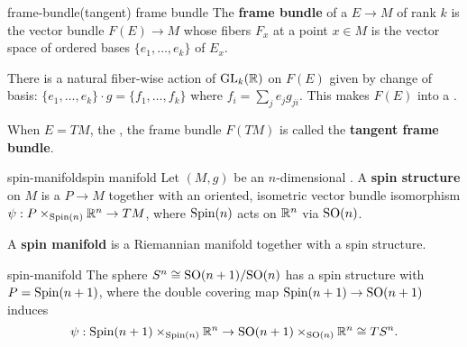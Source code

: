 \begin{topic}{frame-bundle}{(tangent) frame bundle}
    The \textbf{frame bundle} of a  $E \to M$ of rank $k$ is the vector bundle $F(E) \to M$ whose fibers $F_x$ at a point $x \in M$ is the vector space of ordered bases $\{ e_1, \ldots, e_k \}$ of $E_x$.
    
    There is a natural fiber-wise action of $\textup{GL}_k(\mathbb{R})$ on $F(E)$ given by change of basis: $\{ e_1, \ldots, e_k \} \cdot g = \{ f_1, \ldots, f_k \}$ where $f_i = \sum_j e_j g_{ji}$. This makes $F(E)$ into a .
    
    When $E = TM$, the , the frame bundle $F(TM)$ is called the \textbf{tangent frame bundle}.
\end{topic}

\begin{topic}{spin-manifold}{spin manifold}
    Let $(M, g)$ be an $n$-dimensional  . A \textbf{spin structure} on $M$ is a  $P \to M$ together with an oriented, isometric vector bundle isomorphism $\psi : P \times_{\textup{Spin}(n)} \mathbb{R}^n \to TM$, where $\textup{Spin}(n)$ acts on $\mathbb{R}^n$ via $\textup{SO}(n)$.
    
    A \textbf{spin manifold} is a Riemannian manifold together with a spin structure.
\end{topic}

\begin{example}{spin-manifold}
    The sphere $S^n \cong \textup{SO}(n + 1) / \textup{SO}(n)$ has a spin structure with $P = \textup{Spin}(n + 1)$, where the double covering map $\textup{Spin}(n + 1) \to \textup{SO}(n + 1)$ induces
    \[ \psi : \textup{Spin}(n + 1) \times_{\textup{Spin}(n)} \mathbb{R}^n \to \textup{SO}(n + 1) \times_{\textup{SO}(n)} \mathbb{R}^n \cong T S^n . \]
\end{example}

